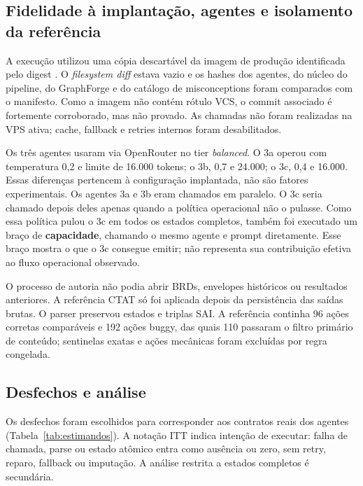\documentclass[11pt,a4paper]{article}
\newcommand{\ITT}{ITT}
\begin{document}
\subsection{Fidelidade à implantação, agentes e isolamento da referência}

A execução utilizou uma cópia descartável da imagem de produção identificada pelo digest . O \emph{filesystem diff} estava vazio e os hashes dos agentes, do núcleo do pipeline, do GraphForge e do catálogo de misconceptions foram comparados com o manifesto. Como a imagem não contém rótulo VCS, o commit associado é fortemente corroborado, mas não provado. As chamadas não foram realizadas na VPS ativa; cache, fallback e retries internos foram desabilitados.

Os três agentes usaram  via OpenRouter no tier \emph{balanced}. O 3a operou com temperatura 0,2 e limite de 16.000 tokens; o 3b, 0,7 e 24.000; o 3c, 0,4 e 16.000. Essas diferenças pertencem à configuração implantada, não são fatores experimentais. Os agentes 3a e 3b eram chamados em paralelo. O 3c seria chamado depois deles apenas quando a política operacional não o pulasse. Como essa política pulou o 3c em todos os estados completos, também foi executado um braço de \textbf{capacidade}, chamando o mesmo agente e prompt diretamente. Esse braço mostra o que o 3c consegue emitir; não representa sua contribuição efetiva ao fluxo operacional observado.

O processo de autoria não podia abrir BRDs, envelopes históricos ou resultados anteriores. A referência CTAT só foi aplicada depois da persistência das saídas brutas. O parser preservou estados e triplas SAI. A referência continha 96 ações corretas comparáveis e 192 ações buggy, das quais 110 passaram o filtro primário de conteúdo; sentinelas exatas e ações mecânicas foram excluídas por regra congelada.

\subsection{Desfechos e análise}

Os desfechos foram escolhidos para corresponder aos contratos reais dos agentes (Tabela~\ref{tab:estimandos}). A notação \ITT{} indica intenção de executar: falha de chamada, parse ou estado atômico entra como ausência ou zero, sem retry, reparo, fallback ou imputação. A análise restrita a estados completos é secundária.
\end{document}
